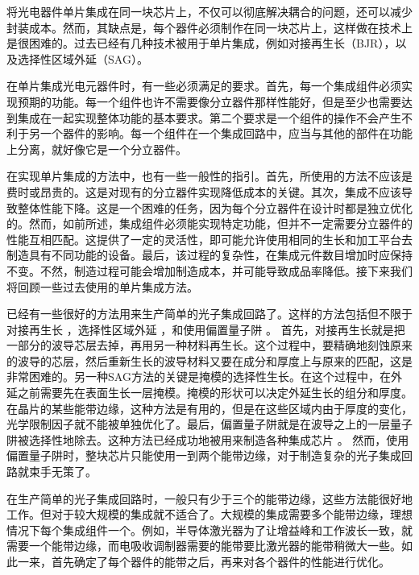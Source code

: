 \documentclass[oneside]{ZJUthesis}
\begin{document}
将光电器件单片集成在同一块芯片上，不仅可以彻底解决耦合的问题，还可以减少封装成本。然而，其缺点是，每个器件必须制作在同一块芯片上，这样做在技术上是很困难的。过去已经有几种技术被用于单片集成，例如对接再生长（BJR），以及选择性区域外延（SAG）。

在单片集成光电元器件时，有一些必须满足的要求。首先，每一个集成组件必须实现预期的功能。每一个组件也许不需要像分立器件那样性能好，但是至少也需要达到集成在一起实现整体功能的基本要求。第二个要求是一个组件的操作不会产生不利于另一个器件的影响。每一个组件在一个集成回路中，应当与其他的部件在功能上分离，就好像它是一个分立器件。

在实现单片集成的方法中，也有一些一般性的指引。首先，所使用的方法不应该是费时或昂贵的。这是对现有的分立器件实现降低成本的关键。其次，集成不应该导致整体性能下降。这是一个困难的任务，因为每个分立器件在设计时都是独立优化的。然而，如前所述，集成组件必须能实现特定功能，但并不一定需要分立器件的性能互相匹配。这提供了一定的灵活性，即可能允许使用相同的生长和加工平台去制造具有不同功能的设备。最后，该过程的复杂性，在集成元件数目增加时应保持不变。不然，制造过程可能会增加制造成本，并可能导致成品率降低。接下来我们将回顾一些过去使用的单片集成方法。

已经有一些很好的方法用来生产简单的光子集成回路了。这样的方法包括但不限于对接再生长 \cite{binsma1997characterization-BJR}，选择性区域外延 \cite{aoki1993ingaas-SAG}，和使用偏置量子阱 \cite{mason1999widely-offset}。 首先，对接再生长就是把一部分的波导芯层去掉，再用另一种材料再生长。这个过程中，要精确地刻蚀原来的波导的芯层，然后重新生长的波导材料又要在成分和厚度上与原来的匹配，这是非常困难的。另一种SAG方法的关键是掩模的选择性生长。在这个过程中，在外延之前需要先在表面生长一层掩模。掩模的形状可以决定外延生长的组分和厚度。在晶片的某些能带边缘，这种方法是有用的，但是在这些区域内由于厚度的变化，光学限制因子就不能被单独优化了。最后，偏置量子阱就是在波导之上的一层量子阱被选择性地除去。这种方法已经成功地被用来制造各种集成芯片 \cite{mason1999widely-offset} \cite{mason2000design-offset} \cite{mason1998tunable-offset} \cite{fish1998compact-offset}。 然而，使用偏置量子阱时，整块芯片只能使用一到两个能带边缘，对于制造复杂的光子集成回路就束手无策了。

在生产简单的光子集成回路时，一般只有少于三个的能带边缘，这些方法能很好地工作。但对于较大规模的集成就不适合了。大规模的集成需要多个能带边缘，理想情况下每个集成组件一个。例如，半导体激光器为了让增益峰和工作波长一致，就需要一个能带边缘，而电吸收调制器需要的能带要比激光器的能带稍微大一些。如此一来，首先确定了每个器件的能带之后，再来对各个器件的性能进行优化。
\end{document}
